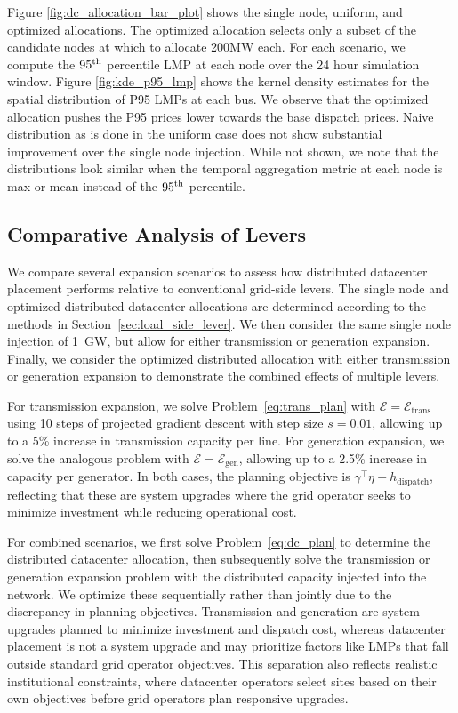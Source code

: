Figure \ref{fig:dc_allocation_bar_plot} shows the single node, uniform, and optimized allocations. The optimized allocation selects only a subset of the candidate nodes at which to allocate 200MW each. For each scenario, we compute the $95\textsuperscript{th}$ percentile LMP at each node over the 24 hour simulation window. Figure \ref{fig:kde_p95_lmp} shows the kernel density estimates for the spatial distribution of P95 LMPs at each bus. We observe that the optimized allocation pushes the P95 prices lower towards the base dispatch prices. Naive distribution as is done in the uniform case does not show substantial improvement over the single node injection. While not shown, we note that the distributions look similar when the temporal aggregation metric at each node is max or mean instead of the $95\textsuperscript{th}$ percentile. 

\subsection{Comparative Analysis of Levers}

We compare several expansion scenarios to assess how distributed datacenter placement performs relative to conventional grid-side levers. The single node and optimized distributed datacenter allocations are determined according to the methods in Section~\ref{sec:load_side_lever}. We then consider the same single node injection of 1~GW, but allow for either transmission or generation expansion. Finally, we consider the optimized distributed allocation with either transmission or generation expansion to demonstrate the combined effects of multiple levers.

For transmission expansion, we solve Problem~\eqref{eq:trans_plan} with $\mathcal{E} = \mathcal{E}_{\text{trans}}$ using 10 steps of projected gradient descent with step size $s = 0.01$, allowing up to a 5\% increase in transmission capacity per line. For generation expansion, we solve the analogous problem with $\mathcal{E} = \mathcal{E}_{\text{gen}}$, allowing up to a 2.5\% increase in capacity per generator. In both cases, the planning objective is $\gamma^\top \eta + h_{\text{dispatch}}$, reflecting that these are system upgrades where the grid operator seeks to minimize investment while reducing operational cost.

For combined scenarios, we first solve Problem~\eqref{eq:dc_plan} to determine the distributed datacenter allocation, then subsequently solve the transmission or generation expansion problem with the distributed capacity injected into the network. We optimize these sequentially rather than jointly due to the discrepancy in planning objectives. Transmission and generation are system upgrades planned to minimize investment and dispatch cost, whereas datacenter placement is not a system upgrade and may prioritize factors like LMPs that fall outside standard grid operator objectives. This separation also reflects realistic institutional constraints, where datacenter operators select sites based on their own objectives before grid operators plan responsive upgrades.

